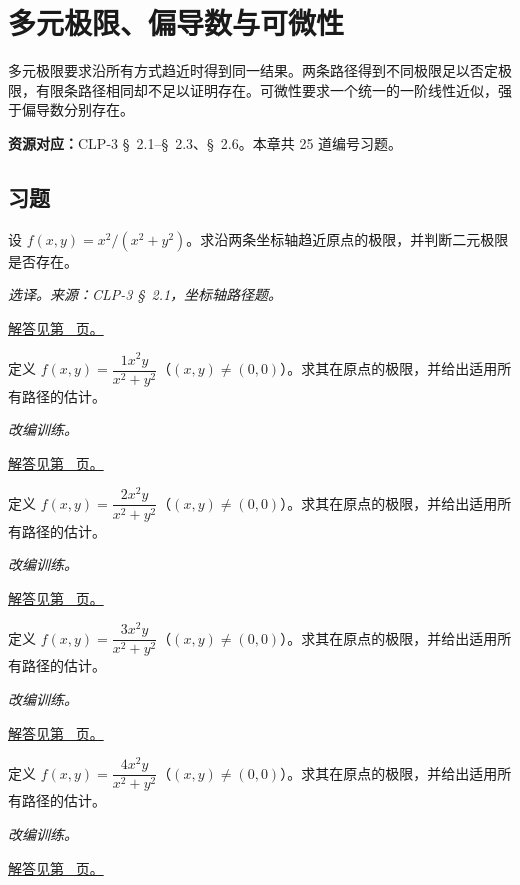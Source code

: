 \documentclass[UTF8,12pt,a4paper,fontset=fandol]{ctexart}
\begin{document}
\clearpage
\section{多元极限、偏导数与可微性}\label{sec:ch32}
多元极限要求沿所有方式趋近时得到同一结果。两条路径得到不同极限足以否定极限，有限条路径相同却不足以证明存在。可微性要求一个统一的一阶线性近似，强于偏导数分别存在。

\textbf{资源对应：}CLP-3 \S~2.1--\S~2.3、\S~2.6。本章共 25 道编号习题。
\subsection{习题}
\begin{example}[沿坐标轴检验不存在]\label{ex:c32q1}
设 $f(x,y)=x^2/(x^2+y^2)$。求沿两条坐标轴趋近原点的极限，并判断二元极限是否存在。
\par\textit{选译。来源：CLP-3 \S~2.1，坐标轴路径题。}\par\hyperref[ans:c32q1]{解答见第~\pageref{ans:c32q1} 页。}
\end{example}
\begin{example}[极坐标估计证明极限]\label{ex:c32q2}
定义 $f(x,y)=\dfrac{1x^2y}{x^2+y^2}$（$(x,y)\ne(0,0)$）。求其在原点的极限，并给出适用所有路径的估计。
\par\textit{改编训练。}\par\hyperref[ans:c32q2]{解答见第~\pageref{ans:c32q2} 页。}
\end{example}
\begin{example}[极坐标估计证明极限]\label{ex:c32q3}
定义 $f(x,y)=\dfrac{2x^2y}{x^2+y^2}$（$(x,y)\ne(0,0)$）。求其在原点的极限，并给出适用所有路径的估计。
\par\textit{改编训练。}\par\hyperref[ans:c32q3]{解答见第~\pageref{ans:c32q3} 页。}
\end{example}
\begin{example}[极坐标估计证明极限]\label{ex:c32q4}
定义 $f(x,y)=\dfrac{3x^2y}{x^2+y^2}$（$(x,y)\ne(0,0)$）。求其在原点的极限，并给出适用所有路径的估计。
\par\textit{改编训练。}\par\hyperref[ans:c32q4]{解答见第~\pageref{ans:c32q4} 页。}
\end{example}
\begin{example}[极坐标估计证明极限]\label{ex:c32q5}
定义 $f(x,y)=\dfrac{4x^2y}{x^2+y^2}$（$(x,y)\ne(0,0)$）。求其在原点的极限，并给出适用所有路径的估计。
\par\textit{改编训练。}\par\hyperref[ans:c32q5]{解答见第~\pageref{ans:c32q5} 页。}
\end{example}
\end{document}
